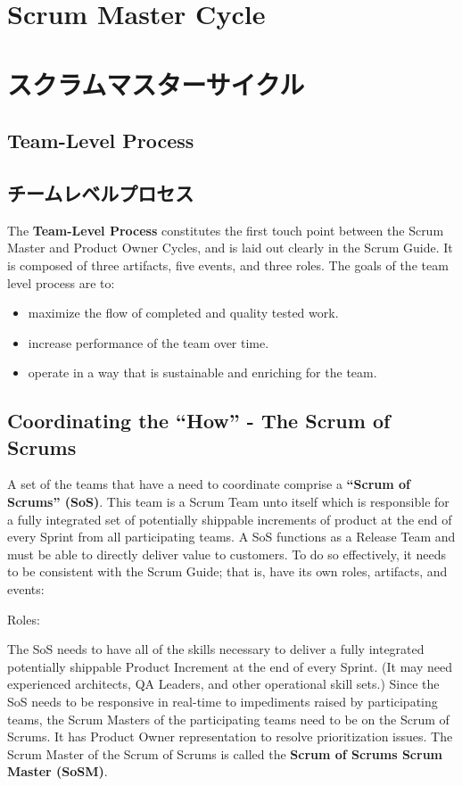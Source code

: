\documentclass[12pt,a4paper,parskip=full]{scrartcl}
\begin{document}
\section{Scrum Master Cycle}
\fi
\section{スクラムマスターサイクル}
\subsection{Team-Level Process}
\fi
\subsection{チームレベルプロセス}
The \textbf{Team-Level Process} constitutes the first touch point between the Scrum Master and Product Owner Cycles, and is laid out clearly in the Scrum Guide. It
is composed of three artifacts, five events, and three roles. The goals of
the team level process are to:
\begin{itemize}
\item maximize the flow of completed and quality tested work.
\item increase performance of the team over time.
\item operate in a way that is sustainable and enriching for the team.
\end{itemize}

\subsection{Coordinating the ``How'' - The Scrum of Scrums}
A set of the teams that have a need to coordinate comprise a \textbf{``Scrum of Scrums'' (SoS)}. This team is a Scrum Team unto itself which is responsible for a fully integrated set of potentially shippable increments of product at the end of every Sprint from all participating teams. A SoS functions as a Release Team and must be able to directly deliver value to customers. To do so effectively, it needs to be consistent with the Scrum Guide; that is, have its own roles, artifacts, and events:

Roles:

The SoS needs to have all of the skills necessary to deliver a fully integrated potentially shippable Product Increment at the end of every Sprint. (It may need experienced architects, QA Leaders, and other operational skill sets.) Since the SoS needs to be responsive in real-time to impediments raised by participating teams, the Scrum Masters of the participating teams need to be on the Scrum of Scrums.
It has Product Owner representation to resolve prioritization issues.
The Scrum Master of the Scrum of Scrums is called the \textbf{Scrum of Scrums Scrum Master (SoSM)}.
\end{document}
